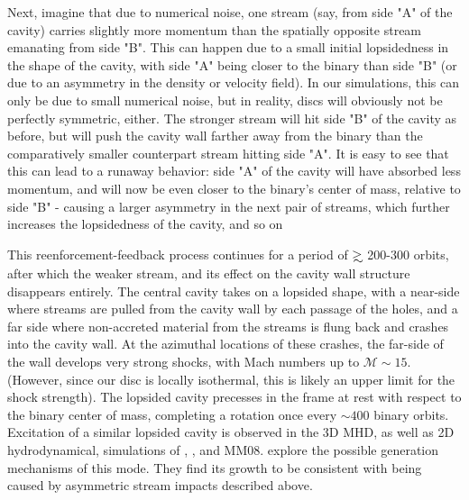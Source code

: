 Next, imagine that due to numerical noise, one stream (say, from side
"A" of the cavity) carries slightly more momentum than the spatially
opposite stream emanating from side "B".  This can happen due to a
small initial lopsidedness in the shape of the cavity, with side "A"
being closer to the binary than side "B" (or due to an asymmetry in
the density or velocity field).  In our simulations, this can only be
due to small numerical noise, but in reality, discs will obviously not
be perfectly symmetric, either.  The stronger stream will hit side "B"
of the cavity as before, but will push the cavity wall farther away
from the binary than the comparatively smaller counterpart stream
hitting side "A".  It is easy to see that this can lead to a runaway
behavior: side "A" of the cavity will have absorbed less momentum, and
will now be even closer to the binary's center of mass, relative to
side "B" - causing a larger asymmetry in the next pair of streams,
which further increases the lopsidedness of the cavity, and so on




This reenforcement-feedback process continues for a period of $\gsim$ 200-300 orbits, after
which the weaker stream, and its effect on the cavity wall structure
disappears entirely. The central cavity takes on a lopsided
shape, with a near-side where streams are pulled from the cavity wall
by each passage of the holes, and a far side where non-accreted
material from the streams is flung back and crashes into the cavity
wall.  At the azimuthal locations of these crashes, the far-side of
the wall develops very strong shocks, with Mach numbers up to
$\mathcal{M}\sim15$. (However, since our disc is locally
isothermal, this is likely an upper limit for the shock strength). 
The lopsided cavity precesses in the frame at rest with respect 
to the binary center of mass, completing a rotation once every 
$\sim400$ binary orbits. Excitation of a similar lopsided cavity is observed in the 3D MHD, as well as 2D hydrodynamical, simulations of \citealt{ShiKrolik:2012}, \citealt{Noble+2012}, and MM08. \cite{ShiKrolik:2012} explore the possible generation mechanisms of this mode. They find its growth to be consistent with being caused by asymmetric stream impacts described above. 

